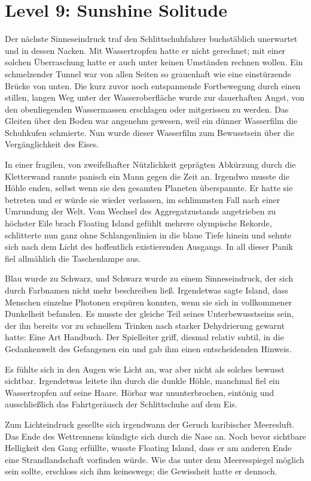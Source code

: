 \section{Level 9: Sunshine Solitude}

Der nächste Sinneseindruck traf den Schlittschuhfahrer buchstäblich unerwartet und in dessen Nacken. Mit Wassertropfen hatte er nicht gerechnet; mit einer solchen Überraschung hatte er auch unter keinen Umständen rechnen wollen. Ein schmelzender Tunnel war von allen Seiten so grauenhaft wie eine einstürzende Brücke von unten. Die kurz zuvor noch entspannende Fortbewegung durch einen stillen, langen Weg unter der Wasseroberfläche wurde zur dauerhaften Angst, von den obenliegenden Wassermassen erschlagen oder mitgerissen zu werden. Das Gleiten über den Boden war angenehm gewesen, weil ein dünner Wasserfilm die Schuhkufen schmierte. Nun wurde dieser Wasserfilm zum Bewusstsein über die Vergänglichkeit des Eises.

In einer fragilen, von zweifelhafter Nützlichkeit geprägten Abkürzung durch die Kletterwand rannte panisch ein Mann gegen die Zeit an. Irgendwo musste die Höhle enden, selbst wenn sie den gesamten Planeten überspannte. Er hatte sie betreten und er würde sie wieder verlassen, im schlimmsten Fall nach einer Umrundung der Welt. Vom Wechsel des Aggregatzustands angetrieben zu höchster Eile brach Floating Island gefühlt mehrere olympische Rekorde, schlitterte nun ganz ohne Schlangenlinien in die blaue Tiefe hinein und sehnte sich nach dem Licht des hoffentlich existierenden Ausgangs. In all dieser Panik fiel allmählich die Taschenlampe aus.

Blau wurde zu Schwarz, und Schwarz wurde zu einem Sinneseindruck, der sich durch Farbnamen nicht mehr beschreiben ließ. Irgendetwas sagte Island, dass Menschen einzelne Photonen erspüren konnten, wenn sie sich in vollkommener Dunkelheit befanden. Es musste der gleiche Teil seines Unterbewusstseins sein, der ihn bereits vor zu schnellem Trinken nach starker Dehydrierung gewarnt hatte: Eine Art Handbuch. Der Spielleiter griff, diesmal relativ subtil, in die Gedankenwelt des Gefangenen ein und gab ihm einen entscheidenden Hinweis.

Es fühlte sich in den Augen wie Licht an, war aber nicht als solches bewusst sichtbar. Irgendetwas leitete ihn durch die dunkle Höhle, manchmal fiel ein Wassertropfen auf seine Haare. Hörbar war ununterbrochen, eintönig und ausschließlich das Fahrtgeräusch der Schlittschuhe auf dem Eis.

Zum Lichteindruck gesellte sich irgendwann der Geruch karibischer Meeresluft. Das Ende des Wettrennens kündigte sich durch die Nase an. Noch bevor sichtbare Helligkeit den Gang erfüllte, wusste Floating Island, dass er am anderen Ende eine Strandlandschaft vorfinden würde. Wie das unter dem Meeresspiegel möglich sein sollte, erschloss sich ihm keineswegs; die Gewissheit hatte er dennoch.

